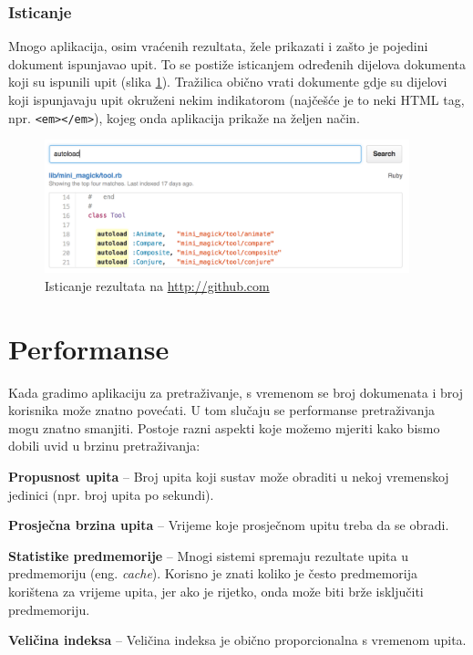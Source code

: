 \documentclass[a4paper,twoside,12pt]{scrreprt}
\begin{document}
\subsection{Isticanje}

Mnogo aplikacija, osim vraćenih rezultata, žele prikazati i zašto je pojedini dokument ispunjavao upit. To se postiže isticanjem određenih dijelova dokumenta koji su ispunili upit (slika \ref{highlighting}). Tražilica obično vrati dokumente gdje su dijelovi koji ispunjavaju upit okruženi nekim indikatorom (najčešće je to neki HTML tag, npr. \texttt{<em></em>}), kojeg onda aplikacija prikaže na željen način.

\begin{figure}[H]
  \centering
  \includegraphics[width=300pt]{highlighting}
  \caption{Isticanje rezultata na \url{http://github.com}}
  \label{highlighting}
\end{figure}

\chapter{Performanse}

Kada gradimo aplikaciju za pretraživanje, s vremenom se broj dokumenata i broj korisnika može znatno povećati. U tom slučaju se performanse pretraživanja mogu znatno smanjiti. Postoje razni aspekti koje možemo mjeriti kako bismo dobili uvid u brzinu pretraživanja:

\begin{compactitem}
  \item \textbf{Propusnost upita} – Broj upita koji sustav može obraditi u nekoj vremenskoj jedinici (npr. broj upita po sekundi).
  \item \textbf{Prosječna brzina upita} – Vrijeme koje prosječnom upitu treba da se obradi.
  \item \textbf{Statistike predmemorije} – Mnogi sistemi spremaju rezultate upita u predmemoriju (eng. \textit{cache}). Korisno je znati koliko je često predmemorija korištena za vrijeme upita, jer ako je rijetko, onda može biti brže isključiti predmemoriju.
  \item \textbf{Veličina indeksa} – Veličina indeksa je obično proporcionalna s vremenom upita.
\end{compactitem}
\end{document}
